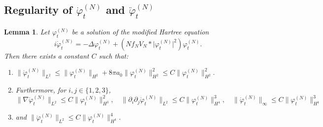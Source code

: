 \documentclass[11pt,a4paper,draft,DIV11]{scrartcl}	%
\newtheorem{lem}[thm]{Lemma}
\newcommand{\norm}[1]{\lVert#1\rVert}	%
\newcommand{\ph}{\varphi_t^{(N)}}	%
\newcommand{\phdot}{\dot{\varphi}_t^{(N)}}	%
\newcommand{\phddot}{\ddot{\varphi}_t^{(N)}}	%
\newcommand{\be}[1]{\begin{equation}\label{eq:#1}}	%
\newcommand{\ee}{\end{equation}}
\newcommand{\bd}{\begin{displaymath}}			%
\newcommand{\ed}{\end{displaymath}}
\begin{document}
\subsection{Regularity of $\phdot$ and $\phddot$}
\label{sec:phdotreg}

\begin{lem} \label{lm:phdotregularity}
Let $\ph$ be a solution of the modified Hartree equation
\be{modHartree}
i \phdot = -\Delta \ph + \left(N f_N V_N \ast \lvert \ph \rvert^2 \right) \ph.
\ee
Then there exists a constant $C$ such that:
\begin{enumerate}
 \item $\norm{\phdot}_{L^2} \leq \norm{\ph}_{H^2} + 8\pi a_0 \norm{\ph}_{H^2}^2 \leq C \norm{\ph}_{H^2}^2.$
\item Furthermore, for $i, j \in \{1,2,3\}$,
\bd
\norm{\nabla \phdot}_{L^2} \leq C \norm{\ph}_{H^3}^2, \quad
\norm{\partial_i \partial_j \phdot}_{L^2} \leq C \norm{\ph}_{H^4}^3, \quad \norm{\phdot}_\infty \leq C \norm{\ph}_{H^4}^3
\ed
\item and $\norm{\phddot}_{L^2} \leq C \norm{\ph}_{H^4}^4$.
\end{enumerate}
\end{lem}
\end{document}
